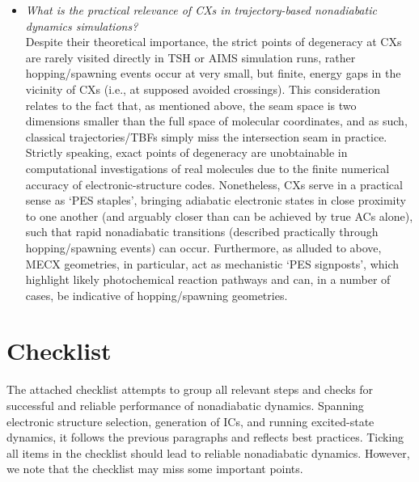 \documentclass[9pt,bestpractices]{livecoms}
\begin{document}
\begin{itemize}
\item{\textit{What is the practical relevance of CXs in trajectory-based nonadiabatic dynamics simulations?} \\
Despite their theoretical importance, the strict points of degeneracy at CXs are rarely visited directly in TSH or AIMS simulation runs,\cite{levine2007isomerization,curchod2017ab} rather hopping/spawning events occur at very small, but finite, energy gaps in the vicinity of CXs (i.e., at supposed avoided crossings).
This consideration relates to the fact that, as mentioned above, the seam space is two dimensions smaller than the full space of molecular coordinates, and as such, classical trajectories/TBFs simply miss the intersection seam in practice.\cite{curchod2018ab}
Strictly speaking, exact points of degeneracy are unobtainable in computational investigations of real molecules due to the finite numerical accuracy of electronic-structure codes.\cite{zhu2016non,yarkony01}
Nonetheless, CXs serve in a practical sense as `PES staples',\cite{todd2024private} bringing adiabatic electronic states in close proximity to one another (and arguably closer than can be achieved by true ACs alone), such that rapid nonadiabatic transitions (described practically through hopping/spawning events) can occur. 
Furthermore, as alluded to above, MECX geometries, in particular, act as mechanistic `PES signposts',\cite{levine2007isomerization,curchod2017ab} which highlight likely photochemical reaction pathways and can, in a number of cases, be indicative of hopping/spawning geometries.
}

\end{itemize}

\section{Checklist}

The attached checklist attempts to group all relevant steps and checks for successful and reliable performance of nonadiabatic dynamics. Spanning electronic structure selection, generation of ICs, and running excited-state dynamics, it follows the previous paragraphs and reflects best practices. Ticking all items in the checklist should lead to reliable nonadiabatic dynamics. However, we note that the checklist may miss some important points. 
\end{document}
